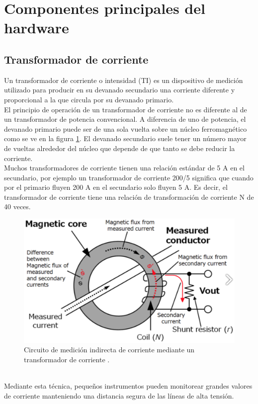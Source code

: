 \section{Componentes principales del hardware}
\subsection{Transformador de corriente}
Un transformador de corriente o intensidad (TI) es un dispositivo de medición utilizado para producir en su devanado secundario una corriente diferente y proporcional a la que circula por su devanado primario.\\
El principio de operación de un transformador de corriente no es diferente al de un transformador de potencia convencional. A diferencia de uno de potencia, el devanado primario puede ser de una sola vuelta sobre un núcleo ferromagnético como se ve en la figura \ref{fig:dibujomedicionti}. El devanado secundario suele tener un número mayor de vueltas alrededor del núcleo que depende de que tanto se debe reducir la corriente.\\
Muchos transformadores de corriente tienen una relación estándar de 5 A en el secundario, por ejemplo un transformador de corriente 200/5 significa que cuando por el primario fluyen 200 A en el secundario solo fluyen 5 A. Es decir, el transformador de corriente tiene una relación de transformación de corriente N de 40 veces.\\
\begin{figure}[h!]
	\centering
	\includegraphics[width=0.8\linewidth]{Figures/dibujo_medicion_TI}
	\caption{Circuito de medición indirecta de corriente mediante un transformador de corriente \citep{hioki}.}
	\label{fig:dibujomedicionti}
\end{figure}\\
Mediante esta técnica, pequeños instrumentos pueden monitorear grandes valores de corriente manteniendo una distancia segura de las líneas de alta tensión.

